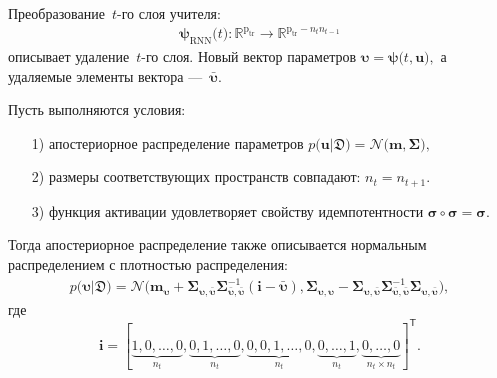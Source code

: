 Преобразование~$t$-го слоя учителя:
\[
\begin{aligned}
\bm{\psi}_{\text{RNN}}\bigr(t\bigr) : \mathbb{R}^{\text{p}_{\text{tr}}} \to \mathbb{R}^{\text{p}_{\text{tr}}-n_tn_{t-1}}
\end{aligned}
\]
описывает удаление~$t$-го слоя. Новый вектор параметров $\bm{\upsilon} = \bm{\psi}\bigr(t, \mathbf{u}\bigr),$ а удаляемые элементы вектора ---~$\bar{\bm{\upsilon}}.$

\begin{theorem}
\label{ch-3:th:rnn:later}
Пусть выполняются условия:
\begin{enumerate}
\item[1)] апостериорное распределение параметров $p\bigr(\mathbf{u}|\mathfrak{D}\bigr) = \mathcal{N}\bigr(\mathbf{m}, \bm{\Sigma}\bigr),$
\item[2)] размеры соответствующих пространств совпадают: $n_t=n_{t+1}.$
\item[3)] функция активации удовлетворяет свойству идемпотентности $\bm{\sigma} \circ \bm{\sigma} = \bm{\sigma}$.
\end{enumerate}
Тогда апостериорное распределение также описывается нормальным распределением с плотностью распределения:
\[
\begin{aligned}
p\bigr(\bm{\upsilon}|\mathfrak{D}\bigr) = \mathcal{N}\bigr(\mathbf{m}_{\bm{\upsilon}}+\bm{\Sigma}_{\bm{\upsilon},\bar{\bm{\upsilon}}} \bm{\Sigma}_{\bar{\bm{\upsilon}},\bar{\bm{\upsilon}}}^{-1} \left(\mathbf{i} - \bar{\bm{\upsilon}}\right), \bm{\Sigma}_{\bm{\upsilon},\bm{\upsilon}} - \bm{\Sigma}_{\bm{\upsilon},\bar{\bm{\upsilon}}}\bm{\Sigma}_{\bar{\bm{\upsilon}},\bar{\bm{\upsilon}}}^{-1}\bm{\Sigma}_{\bm{\upsilon},\bar{\bm{\upsilon}}}\bigr),
\end{aligned}
\]
где
\[
\mathbf{i}=[\underbrace{1, 0, \ldots, 0}_{n_t}, \underbrace{0, 1, \ldots, 0}_{n_t}, \underbrace{0, 0, 1, \ldots, 0}_{n_t}, \underbrace{0, \ldots, 1}_{n_t}, \underbrace{0, \ldots, 0}_{n_t\times n_t}]^{\mathsf{T}}.
\]
\end{theorem}
